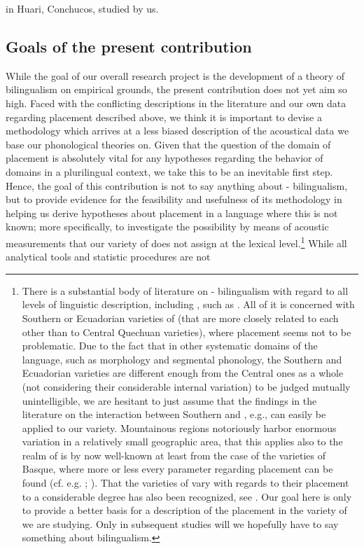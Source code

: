 \documentclass[output=paper]{LSP/langsci}
\begin{document}
in Huari, Conchucos, studied by us.  

\subsection{Goals of the present contribution}
While the goal of our overall research project is the development of a  theory of bilingualism on empirical grounds, the present contribution does not yet aim so high. Faced with the conflicting descriptions in the literature and our own data regarding  placement described above, we think it is important to devise a methodology which arrives at a less biased description of the acoustical data we base our phonological theories on. Given that the question of the domain of  placement is absolutely vital for any hypotheses regarding the behavior of  domains in a plurilingual context, we take this to be an inevitable first step. Hence, the goal of this contribution is not to say anything about - bilingualism, but to provide evidence for the feasibility and usefulness of its methodology in helping us derive hypotheses about  placement in a language where this is not known; more specifically, to investigate the possibility by means of acoustic measurements that our variety of  does not assign  at the lexical level.\footnote{There is a substantial body of literature on - bilingualism with regard to all levels of linguistic description, including , such as \citet{ORourke2005,ORourke2007,ORourke2008,ORourke2009,Muntendam2010,ORourke2010,ORourke2012,Muntendam2012a,Muntendam2012b,Rijswijk2014,Muntendam2016,Muysken2016}. All of it is concerned with Southern or Ecuadorian varieties of  (that are more closely related to each other than to Central Quechuan varieties), where  placement seems not to be problematic. Due to the fact that in other systematic domains of the language, such as morphology and segmental phonology, the Southern and Ecuadorian varieties are different enough from the Central ones as a whole (not considering their considerable internal variation) to be judged mutually unintelligible, we are hesitant to just assume that the findings in the literature on the interaction between Southern  and  , e.g., can easily be applied to our variety. Mountainous regions notoriously harbor enormous variation in a relatively small geographic area, that this applies also to the realm of  is by now well-known at least from the case of the varieties of Basque, where more or less every  parameter regarding  placement can be found (cf. e.g. \citealt{Hualde2008basque}; \citealt{Hulst2010,Aurrekoetxea.2012}). That the varieties of  vary with regards to their  placement to a considerable degree has also been recognized, see \citet{Wetzels2010}. Our goal here is only to provide a better basis for a description of the  placement in the variety of  we are studying. Only in subsequent studies will we hopefully have to say something about bilingualism.}  While all analytical tools and statistic procedures are not 
\end{document}
